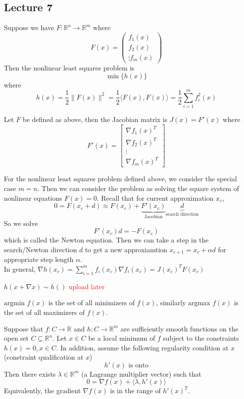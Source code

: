 \subsection{Lecture 7}
\begin{definition}
  Suppose we have $F: \mathbb R^n \to \mathbb R^m$ where $$F(x) = \begin{pmatrix}
    f_1(x) \\ f_2(x) \\ \vdots f_m(x)
  \end{pmatrix}$$ Then the nonlinear least squares problem is $$\min \{h(x)\}$$ where $$h(x) = \frac{1}{2} \|F(x)\|^2 = \frac{1}{2}\langle F(x), F(x) \rangle = \frac{1}{2} \sum^m_{i=1} f_i^2(x)$$
\end{definition}
\begin{definition}
  Let $F$ be defined as above, then the Jacobian matrix is $J(x) = F'(x)$ where $$F'(x) = \begin{bmatrix}
    \nabla f_1(x)^T \\ \nabla f_2(x)^T \\ \vdots \\ \nabla f_m(x)^T
  \end{bmatrix}$$
\end{definition}
\begin{problem}
  For the nonlinear least squares problem defined above, we consider the special case $m = n$. Then we can consider the problem as solving the square system of nonlinear equations $F(x) = 0$. Recall that for current approximation $x_c$, $$0 = F(x_c + d) \approx F(x_c) + \underbrace{F'(x_c)}_{\text{Jacobian}}\underbrace{d}_{\text{search direction}}$$ So we solve $$F'(x_c)d = -F(x_c)$$ which is called the Newton equation. Then we can take a step in the search/Newton direction $d$ to get a new approxiamtion $x_{c+1} = x_c + \alpha d$ for appropriate step length $\alpha$.
  \\ In general, $\nabla h(x_c)=\sum_{i=1}^mf_i(x_c)\nabla f_i(x_c)=J(x_c)^TF(x_c)$
\end{problem}
\begin{definition}
  $h(x+\nabla x)\sim h()$ \textcolor{red}{upload later}
\end{definition}
\begin{definition}
  $\text{argmin } f(x)$ is the set of all minimizers of $f(x)$, similarly $\text{argmax }f(x)$ is the set of all maximizers of $f(x)$.
\end{definition}
\begin{theorem}
  Suppose that $f: C \to \mathbb R$ and $h: C \to \mathbb R^m$ are sufficiently smooth functions on the open set $C \subseteq \mathbb R^n$. Let $x \in C$ be a local minimum of $f$ subject to the constraints $h(x) = 0, x \in C$. In addition, assume the following regularity condition at $x$ (constraint qualification at $x$) $$h'(x) \text{ is onto}$$
  Then there exists $\lambda \in \mathbb R^m$ (a Lagrange multiplier vector) such that $$0 = \nabla f(x) + \langle \lambda, h'(x) \rangle$$ Equivalently, the gradient $\nabla f(x)$ is in the range of $h'(x)^T$.
\end{theorem}